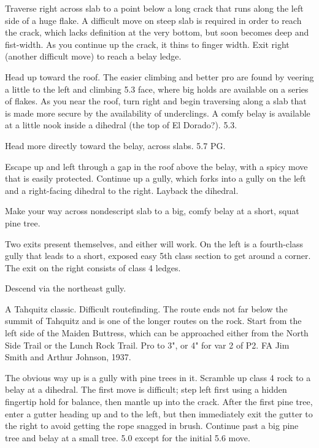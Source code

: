 \documentclass{tahquitz}
\begin{document}
 Traverse right across slab to a point below a long crack that runs
along the left side of a huge flake. A difficult move on steep slab is required in
order to reach the crack, which lacks definition at the very bottom, but soon becomes
deep and fist-width. As you continue up the crack, it thins to finger width.
Exit right (another difficult move) to reach a belay ledge.

 Head up toward the roof. The easier climbing and better pro are found
by veering a little to the left and climbing 5.3 face, where big holds are available on a series of flakes.
As you near the roof, turn right and begin traversing
along a slab that is made more secure by the availability of underclings. A comfy
belay is available at a little nook inside a dihedral (the top of El Dorado?). 5.3.

 Head more directly toward the belay, across slabs. 5.7 PG.

 Escape up and left through a gap in the roof above the belay, with a spicy move
that is easily protected. Continue up a gully, which forks into a gully on the left and a right-facing
dihedral to the right. Layback the dihedral.

 Make your way across nondescript slab to a big, comfy belay at a short, squat pine tree.

 Two exits present themselves, and either will work. On the left is a fourth-class
gully that leads to a short, exposed easy 5th class section to get around a corner.
The exit on the right consists of class 4 ledges.

Descend via the northeast gully.





A Tahquitz classic. Difficult routefinding. The route ends not far
below the summit of Tahquitz and is one of the longer routes on the
rock. Start from the left side of the Maiden Buttress, which can be
approached either from the North Side Trail or the Lunch Rock Trail.
Pro to 3", or 4" for var 2 of P2.
FA Jim Smith and Arthur Johnson, 1937.

 The obvious way up is a gully with pine trees in it. Scramble up
class 4 rock to a belay at a dihedral. The first move is difficult;
step left first using a hidden fingertip hold for balance, then mantle
up into the crack.
After the first pine tree, enter a gutter heading up
and to the left, but then immediately exit the gutter to the right to
avoid getting the rope snagged in brush. Continue past a big pine
tree and belay at a small tree. 5.0 except for the initial 5.6
move.
\end{document}

